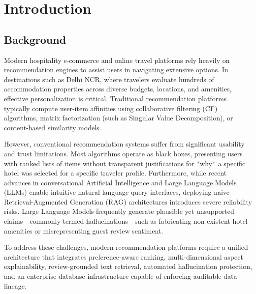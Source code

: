 \chapter{Introduction}\label{ch:intro}

\section{Background}
Modern hospitality e-commerce and online travel platforms rely heavily on recommendation engines to assist users in navigating extensive options. In destinations such as Delhi NCR, where travelers evaluate hundreds of accommodation properties across diverse budgets, locations, and amenities, effective personalization is critical. Traditional recommendation platforms typically compute user-item affinities using collaborative filtering (CF) algorithms, matrix factorization (such as Singular Value Decomposition), or content-based similarity models.

However, conventional recommendation systems suffer from significant usability and trust limitations. Most algorithms operate as black boxes, presenting users with ranked lists of items without transparent justifications for *why* a specific hotel was selected for a specific traveler profile. Furthermore, while recent advances in conversational Artificial Intelligence and Large Language Models (LLMs) enable intuitive natural language query interfaces, deploying naive Retrieval-Augmented Generation (RAG) architectures introduces severe reliability risks. Large Language Models frequently generate plausible yet unsupported claims—commonly termed hallucinations—such as fabricating non-existent hotel amenities or misrepresenting guest review sentiment.

To address these challenges, modern recommendation platforms require a unified architecture that integrates preference-aware ranking, multi-dimensional aspect explainability, review-grounded text retrieval, automated hallucination protection, and an enterprise database infrastructure capable of enforcing auditable data lineage.

